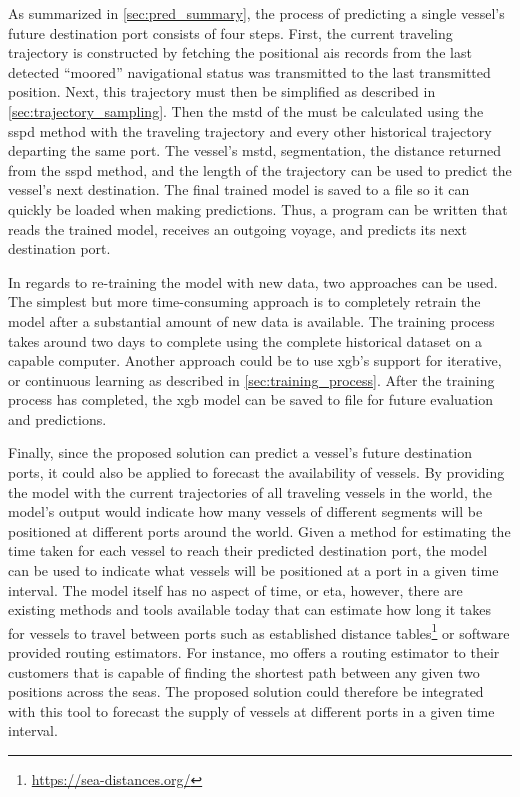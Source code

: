 As summarized in \cref{sec:pred_summary}, the process of predicting a single vessel's future destination port consists of four steps. First, the current traveling trajectory is constructed by fetching the positional \acrshort{ais} records from the last detected ``moored'' navigational status was transmitted to the last transmitted position. Next, this trajectory must then be simplified as described in \cref{sec:trajectory_sampling}. Then the \acrfull{mstd} of the must be calculated using the \acrshort{sspd} method with the traveling trajectory and every other historical trajectory departing the same port. The vessel's \acrshort{mstd}, segmentation, the distance returned from the \acrshort{sspd} method, and the length of the trajectory can be used to predict the vessel's next destination. The final trained model is saved to a file so it can quickly be loaded when making predictions. Thus, a program can be written that reads the trained model, receives an outgoing voyage, and predicts its next destination port.

In regards to re-training the model with new data, two approaches can be used. The simplest but more time-consuming approach is to completely retrain the model after a substantial amount of new data is available. The training process takes around two days to complete using the complete historical dataset on a capable computer. Another approach could be to use \acrfull{xgb}'s support for iterative, or continuous learning as described in \cref{sec:training_process}. After the training process has completed, the \acrshort{xgb} model can be saved to file for future evaluation and predictions.

Finally, since the proposed solution can predict a vessel's future destination ports, it could also be applied to forecast the availability of vessels. By providing the model with the current trajectories of all traveling vessels in the world, the model's output would indicate how many vessels of different segments will be positioned at different ports around the world. Given a method for estimating the time taken for each vessel to reach their predicted destination port, the model can be used to indicate what vessels will be positioned at a port in a given time interval. The model itself has no aspect of time, or \acrshort{eta}, however, there are existing methods and tools available today that can estimate how long it takes for vessels to travel between ports such as established distance tables\footnote{\url{https://sea-distances.org/}} or software provided routing estimators. For instance, \acrfull{mo} offers a routing estimator to their customers that is capable of finding the shortest path between any given two positions across the seas. The proposed solution could therefore be integrated with this tool to forecast the supply of vessels at different ports in a given time interval.

